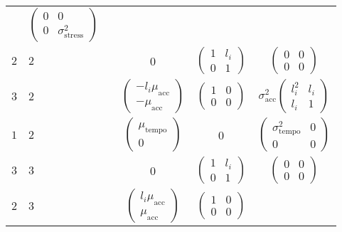 \documentclass[12pt]{article}
\begin{document}
\begin{table}
\begin{tabular}[h!]{@{}llcccc@{}}
          & $\begin{pmatrix}0&0\\0&\sigma_{\textrm{stress}}^2\end{pmatrix}$\\
  $2$ & $2$ && 0 & $\begin{pmatrix} 1 & l_i \\ 0 & 1 \end{pmatrix}$ 
        & $\begin{pmatrix}0&0\\0&0\end{pmatrix}$\\
  $3$ & $2$ && $\begin{pmatrix} -l_i\mu_{\textrm{acc}}\\ -\mu_{\textrm{acc}}\end{pmatrix}$ 
                                    & $\begin{pmatrix} 1 & 0 \\ 0 &
                                      0 \end{pmatrix}$ 
        & $\sigma_{\textrm{acc}}^2\begin{pmatrix} l_i^2 & l_i\\ l_i & 1 \end{pmatrix}$\\
  $1$ & $2$ && $\begin{pmatrix} \mu_{\textrm{tempo}}\\0\end{pmatrix}$ & 0
        & $\begin{pmatrix} \sigma^2_{\textrm{tempo}} & 0\\ 0 & 0 \end{pmatrix}$\\
  $3$ & $3$ && 0& $\begin{pmatrix} 1 & l_i \\ 0 & 1 \end{pmatrix}$ 
        & $\begin{pmatrix}0&0\\0&0\end{pmatrix}$\\
$2$ & $3$ && $\begin{pmatrix} l_i\mu_{\textrm{acc}}\\ \mu_{\textrm{acc}}\end{pmatrix}$ 
                                    & $\begin{pmatrix} 1 & 0 \\ 0 &
                                      0 \end{pmatrix}$ 

\end{tabular}
\end{table}
\end{document}
